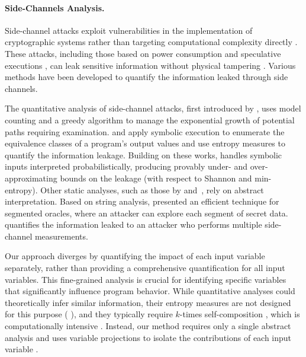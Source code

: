 \paragraph{Side-Channels Analysis.}
Side-channel attacks exploit vulnerabilities in the implementation of cryptographic systems rather than targeting computational complexity directly . These attacks, including those based on power consumption  and speculative executions , can leak sensitive information without physical tampering . Various methods have been developed to quantify the information leaked through side channels.

The quantitative analysis of side-channel attacks, first introduced by , uses model counting and a greedy algorithm to manage the exponential growth of potential paths requiring examination.  and  apply symbolic execution to enumerate the equivalence classes of a program's output values and use entropy measures to quantify the information leakage. Building on these works,  handles symbolic inputs interpreted probabilistically, producing provably under- and over-approximating bounds on the leakage (with respect to Shannon and min-entropy). Other static analyses, such as those by  and~, rely on abstract interpretation. Based on string analysis,  presented an efficient technique for segmented oracles, where an attacker can explore each segment of secret data.  quantifies the information leaked to an attacker who performs multiple side-channel measurements.

Our approach diverges by quantifying the impact of each input variable separately, rather than providing a comprehensive quantification for all input variables.
This fine-grained analysis is crucial for identifying specific variables that significantly influence program behavior. While quantitative analyses could theoretically infer similar information, their entropy measures are not designed for this purpose (\cf{} ), and they typically require $k$-times self-composition , which is computationally intensive . Instead, our method requires only a single abstract analysis and uses variable projections to isolate the contributions of each input variable .


